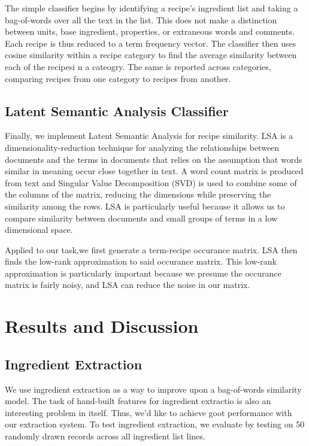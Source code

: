 \documentclass[11pt]{article}
\begin{document}
The simple classifier begins by identifying a recipe's ingredient list and taking a bag-of-words over all the text in the list. This does not make a distinction between units, base ingredient, properties, or extraneous words and comments. Each recipe is thus reduced to a term frequency vector. The classifier then uses cosine similarity within a recipe category to find the average similarity between each of the recipesi n a cateogry. The same is reported across categories, comparing recipes from one category to recipes from another. 

\subsection{Latent Semantic Analysis Classifier}

Finally, we implement Latent Semantic Analysis for recipe similarity. LSA is a dimensionality-reduction technique for analyzing the relationships between documents and the terms in documents that relies on the assumption that words similar in meaning occur close together in text. A word count matrix is produced from text and Singular Value Decomposition (SVD) is used to combine some of the columns of the matrix, reducing the dimensions while preserving the similarity among the rows. LSA is particularly useful because it allows us to compare similarity between documents and small groups of terms in a low dimensional space. 

Applied to our task,we first generate a term-recipe occurance matrix. LSA then finds the low-rank approximation to said occurance matrix. This low-rank approximation is particularly important because we presume the occurance matrix is fairly noisy, and LSA can reduce the noise in our matrix. 

\section{Results and Discussion}

\subsection{Ingredient Extraction}

We use ingredient extraction as a way to improve upon a bag-of-words similarity model. The task of hand-built features for ingredient extractio is also an interesting problem in itself. Thus, we'd like to achieve goot performance with our extraction system. To test ingredient extraction, we evaluate by testing on 50 randomly drawn records across all ingredient list lines. 
\end{document}
